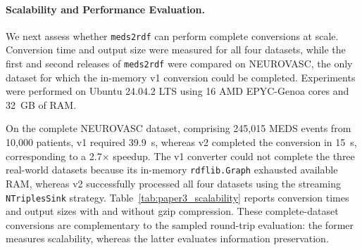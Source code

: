 \paragraph{Scalability and Performance Evaluation.}\label{sec:paper3_scalability}
We next assess whether \texttt{meds2rdf} can perform complete conversions at scale. Conversion time and output size were measured for all four datasets, while the first and second releases of \texttt{meds2rdf} were compared on NEUROVASC, the only dataset for which the in-memory v1 conversion could be completed. Experiments were performed on Ubuntu 24.04.2 LTS using 16 AMD EPYC-Genoa cores and 32~GB of RAM.

On the complete NEUROVASC dataset, comprising 245,015 MEDS events from 10,000 patients, v1 required 39.9~s, whereas v2 completed the conversion in 15~s, corresponding to a 2.7$\times$ speedup. The v1 converter could not complete the three real-world datasets because its in-memory \texttt{rdflib.Graph} exhausted available RAM, whereas v2 successfully processed all four datasets using the streaming \texttt{NTriplesSink} strategy. Table~\ref{tab:paper3_scalability} reports conversion times and output sizes with and without gzip compression. These complete-dataset conversions are complementary to the sampled round-trip evaluation: the former measures scalability, whereas the latter evaluates information preservation.

\begin{table}[htbp]
\centering
\caption{Scalability results for \texttt{meds2rdf} v2 (NTriplesSink) on complete conversions of all four datasets.} %
\label{tab:paper3_scalability}
\end{table}
%
%
%
%

